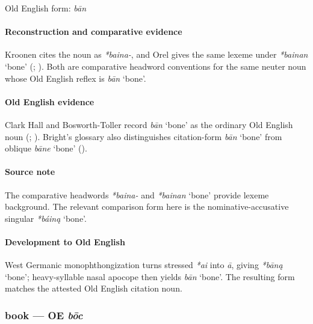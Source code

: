 \documentclass[
  british,
  a4paper,
]{article}
\providecommand{\Recon}[1]{\emph{*#1}}
\begin{document}
Old English form: \emph{bān}

\paragraph{Reconstruction and comparative
evidence}\label{reconstruction-and-comparative-evidence-7}

Kroonen cites the noun as {\emph{*baina-}}, and Orel gives the same
lexeme under \Recon{bainan} `bone' (; ). Both are comparative
headword conventions for the same neuter noun whose Old English reflex
is {\emph{bān}} `bone'.

\paragraph{Old English evidence}\label{old-english-evidence-7}

Clark Hall and Bosworth-Toller record {\emph{bān}} `bone' as the
ordinary Old English noun (; ).
Bright's glossary also distinguishes citation-form {\emph{bān}} `bone'
from oblique {\emph{bāne}} `bone'
().

\paragraph{Source note}\label{source-note-1}

The comparative headwords {\emph{*baina-}} and \Recon{bainan} `bone'
provide lexeme background. The relevant comparison form here is the
nominative-accusative singular \Recon{báiną} `bone'.

\paragraph{Development to Old
English}\label{development-to-old-english-7}

West Germanic monophthongization turns stressed \emph{*ai} into
\emph{ā}, giving \Recon{bāną} `bone'; heavy-syllable nasal apocope then
yields {\emph{bān}} `bone'. The resulting form matches the attested Old
English citation noun.

\subsubsection{\texorpdfstring{book --- OE
\emph{bōc}}{book --- OE bōc}}\label{book-oe-bux14dc}
\end{document}
